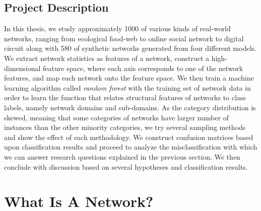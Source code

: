 \documentclass{article}
\begin{document}
\subsection{Project Description}

In this thesis, we study approximately 1000 of various kinds of real-world networks, ranging from ecological food-web to online social network to digital circuit along with 580 of synthetic networks generated from four different models. We extract network statistics as features of a network, construct a high-dimensional feature space, where each axis corresponds to one of the network features, and map each network onto the feature space. We then train a machine learning algorithm called \textit{random forest} with the training set of network data in order to learn the function that relates structural features of networks to class labels, namely network domains and sub-domains. As the category distribution is skewed, meaning that some categories of networks have larger number of instances than the other minority categories, we try several sampling methods and show the effect of each methodology. We construct confusion matrices based upon classification results and proceed to analyze the misclassification with which we can answer research questions explained in the previous section. We then conclude with discussion based on several hypotheses and classification results.

\newpage
\section{What Is A Network?}
\end{document}
